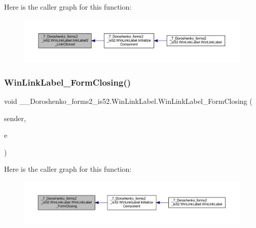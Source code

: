 Here is the caller graph for this function\+:
\nopagebreak
\begin{figure}[H]
\begin{center}
\leavevmode
\includegraphics[width=350pt]{class__7___doroshenko__forms2__is52_1_1_win_link_label_ae8a53f496acc807d85022947c551c316_icgraph}
\end{center}
\end{figure}
\hypertarget{class__7___doroshenko__forms2__is52_1_1_win_link_label_af8a160c10849b2c88114b6aab04fff9d}{}\label{class__7___doroshenko__forms2__is52_1_1_win_link_label_af8a160c10849b2c88114b6aab04fff9d} 
\subsubsection{\texorpdfstring{Win\+Link\+Label\+\_\+\+Form\+Closing()}{WinLinkLabel\_FormClosing()}}
{\footnotesize\ttfamily void \+\_\+\_\+\+Doroshenko\+\_\+forms2\+\_\+is52.\+Win\+Link\+Label.\+Win\+Link\+Label\+\_\+\+Form\+Closing (\begin{DoxyParamCaption}\item[{object}]{sender,  }\item[{Form\+Closing\+Event\+Args}]{e }\end{DoxyParamCaption})\hspace{0.3cm}{\ttfamily [private]}}

Here is the caller graph for this function\+:
\nopagebreak
\begin{figure}[H]
\begin{center}
\leavevmode
\includegraphics[width=350pt]{class__7___doroshenko__forms2__is52_1_1_win_link_label_af8a160c10849b2c88114b6aab04fff9d_icgraph}
\end{center}
\end{figure}


